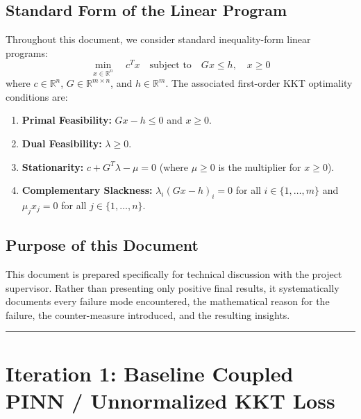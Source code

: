 \documentclass[11pt,a4paper]{article}
\begin{document}
\subsection{Standard Form of the Linear Program}
Throughout this document, we consider standard inequality-form linear programs:
\begin{equation}
    \min_{x \in \mathbb{R}^n} \quad c^T x \quad \text{subject to} \quad G x \le h, \quad x \ge 0
\end{equation}
where $c \in \mathbb{R}^n$, $G \in \mathbb{R}^{m \times n}$, and $h \in \mathbb{R}^m$. The associated first-order KKT optimality conditions are:
\begin{enumerate}[leftmargin=1.8em, itemsep=2pt]
    \item \textbf{Primal Feasibility:} $G x - h \le 0$ and $x \ge 0$.
    \item \textbf{Dual Feasibility:} $\lambda \ge 0$.
    \item \textbf{Stationarity:} $c + G^T \lambda - \mu = 0$ (where $\mu \ge 0$ is the multiplier for $x \ge 0$).
    \item \textbf{Complementary Slackness:} $\lambda_i (G x - h)_i = 0$ for all $i \in \{1, \dots, m\}$ and $\mu_j x_j = 0$ for all $j \in \{1, \dots, n\}$.
\end{enumerate}

\subsection{Purpose of this Document}
This document is prepared specifically for technical discussion with the project supervisor. Rather than presenting only positive final results, it systematically documents every failure mode encountered, the mathematical reason for the failure, the counter-measure introduced, and the resulting insights.

\vspace{1em}
\hrule
\vspace{1.5em}

\section{Iteration 1: Baseline Coupled PINN / Unnormalized KKT Loss}
\end{document}
